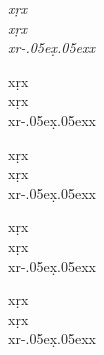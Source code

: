 \documentclass[output=book,nonflat,modfonts,
  colorlinks,citecolor=brown, 
		  ]{langsci/langscibook}
\begin{document}
 
 
 
  
\maketitle                
\frontmatter 

{\sloppy\tableofcontents}
 
 
  
\mainmatter     

\newcommand{\R}{r\kern-.05ex{̣}\kern.05ex}
{\itshape
\Huge
\noindent
xṛx\\
x\d{r}x\\
x{\R}x

\normalsize
\noindent
xṛx\\
x\d{r}x\\
x{\R}x

\scriptsize
\noindent
xṛx\\
x\d{r}x\\
x{\R}x

\footnotesize
\noindent
xṛx\\
x\d{r}x\\
x{\R}x

\LARGE
\noindent
xṛx\\
x\d{r}x\\
x{\R}x
}

 


  


 
 
\end{document}
